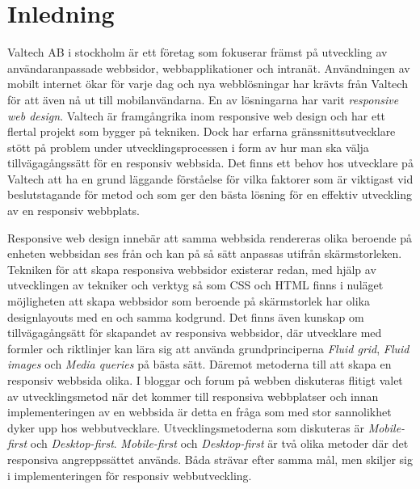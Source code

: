 \documentclass[11pt]{article}
\begin{document}
\section{Inledning}
Valtech AB i stockholm är ett företag som fokuserar främst på utveckling av användaranpassade webbsidor, webbapplikationer och intranät. Användningen av mobilt internet ökar för varje dag och nya webblösningar har krävts från Valtech för att även nå ut till mobilanvändarna. En av lösningarna har varit \textit{responsive web design}. Valtech är framgångrika inom responsive web design och har ett flertal projekt som bygger på tekniken. Dock har erfarna gränssnittsutvecklare stött på problem under utvecklingsprocessen i form av hur man ska välja tillvägagångssätt för en responsiv webbsida. Det finns ett behov hos utvecklare på Valtech att ha en grund läggande förståelse för vilka faktorer som är viktigast vid beslutstagande för metod och som ger den bästa lösning för en effektiv utveckling av en responsiv webbplats. 

Responsive web design innebär att samma webbsida rendereras olika beroende på enheten webbsidan ses från och kan på så sätt anpassas utifrån skärmstorleken. Tekniken för att skapa responsiva webbsidor existerar redan, med hjälp av utvecklingen av tekniker och verktyg så som CSS och HTML finns i nuläget möjligheten att skapa webbsidor som beroende på skärmstorlek har olika designlayouts med en och samma kodgrund. Det finns även kunskap om tillvägagångsätt för skapandet av responsiva webbsidor, där utvecklare med formler och riktlinjer kan lära sig att använda grundprinciperna \textit{Fluid grid}, \textit{Fluid images} och \textit{Media queries} på bästa sätt. Däremot metoderna till att skapa en responsiv webbsida olika.  I bloggar och forum på webben diskuteras flitigt valet av utvecklingsmetod när det kommer till responsiva webbplatser och innan implementeringen av en webbsida är detta en fråga som med stor sannolikhet dyker upp hos webbutvecklare. Utvecklingsmetoderna som diskuteras är \textit{Mobile-first} och \textit{Desktop-first}. \textit{Mobile-first} och \textit{Desktop-first} är två olika metoder där det responsiva angreppssättet används. Båda strävar efter samma mål, men skiljer sig i implementeringen för responsiv webbutveckling.
\end{document}
